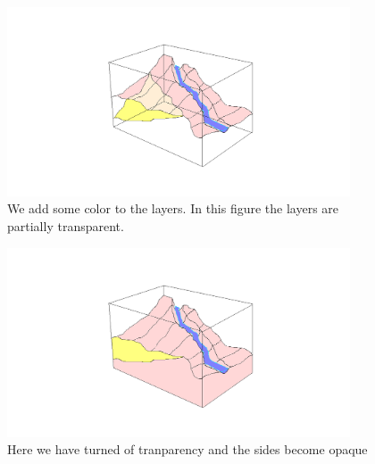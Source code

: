 \documentclass[12pt,a4paper]{article}
\begin{document}
\begin{figure}
\centering
\includegraphics[width=4in]{addColor}
\caption[]{
  \footnotesize
  We add some color to the layers. In this figure the layers are partially transparent.
  \label{fig:addColor}
}
\end{figure}

\begin{figure}
\centering
\includegraphics[width=4in]{offTransparency}
\caption[]{
  \footnotesize
  Here we have turned of tranparency and the sides become opaque
  \label{fig:offTransparency}
}
\end{figure}
\end{document}
